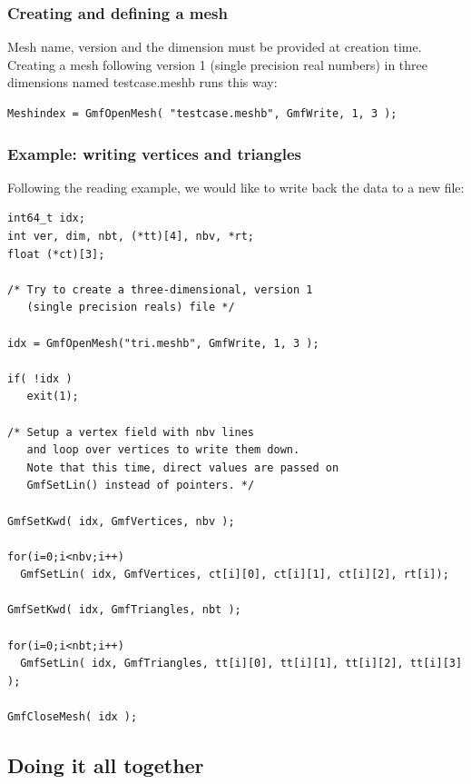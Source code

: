 \documentclass[a4paper,12pt]{article}
\begin{document}
\subsubsection{Creating and defining a mesh}

Mesh name, version and the dimension must be provided at creation time. Creating a mesh following version 1 (single precision real numbers) in three dimensions named testcase.meshb runs this way:

\begin{tt}
\begin{verbatim}
Meshindex = GmfOpenMesh( "testcase.meshb", GmfWrite, 1, 3 );
\end{verbatim}
\end{tt}
\normalfont

\subsubsection{Example: writing vertices and triangles}

Following the reading example, we would like to write back the data to a new file:

\begin{tt}
\begin{verbatim}
int64_t idx;
int ver, dim, nbt, (*tt)[4], nbv, *rt;
float (*ct)[3];

/* Try to create a three-dimensional, version 1
   (single precision reals) file */

idx = GmfOpenMesh("tri.meshb", GmfWrite, 1, 3 );

if( !idx )
   exit(1);

/* Setup a vertex field with nbv lines
   and loop over vertices to write them down.
   Note that this time, direct values are passed on
   GmfSetLin() instead of pointers. */

GmfSetKwd( idx, GmfVertices, nbv );

for(i=0;i<nbv;i++)
  GmfSetLin( idx, GmfVertices, ct[i][0], ct[i][1], ct[i][2], rt[i]);

GmfSetKwd( idx, GmfTriangles, nbt );

for(i=0;i<nbt;i++)
  GmfSetLin( idx, GmfTriangles, tt[i][0], tt[i][1], tt[i][2], tt[i][3] );

GmfCloseMesh( idx );
\end{verbatim}
\end{tt}
\normalfont


\subsection{Doing it all together}
\end{document}
